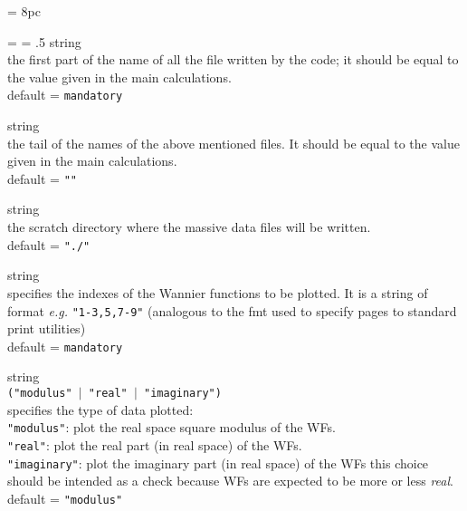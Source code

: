 \newdimen\descindent \descindent = 8pc
{\noindent \leftskip = \descindent \parskip = .5\baselineskip
{}%
{\sc string} \\ the first part of the name of all the file written by the code;
              it should be equal to the value given in the main calculations.\\
              {\sc default} = {\tt mandatory} \par

\noindent{}%
{\sc string} \\ the tail of the names of the above mentioned files.
              It should be equal to the value given in the main calculations.\\
              {\sc default} = {\tt ""} \par

\noindent{}%
{\sc string} \\ the scratch directory where the massive data files will be written.\\
              {\sc default} = {\tt "./"} \par

\noindent{}%
{\sc string} \\ specifies the indexes of the Wannier functions to be plotted.
              It is a string of format {\it e.g.} {\tt "1-3,5,7-9"}
              (analogous to the fmt used to specify pages to standard print utilities)\\
              {\sc default} = {\tt mandatory} \par

\noindent{}%
{\sc string} \\ {\tt ("modulus" $\mid$ "real" $\mid$ "imaginary") }\\
              specifies the type of data plotted:\\
                {\tt "modulus"}:    plot the real space square modulus of the WFs. \\
                {\tt "real"}:       plot the real part (in real space) of the WFs. \\
                {\tt "imaginary"}:  plot the imaginary part (in real space) of the WFs
                              this choice should be intended as a check because WFs
                              are expected to be more or less {\it real}.\\
              {\sc default} = {\tt "modulus"} \par

}
